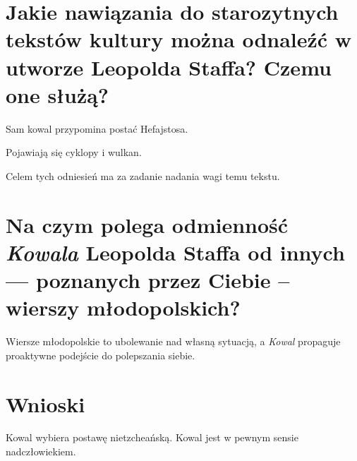 \documentclass[a4paper]{article}
\begin{document}
\section{Jakie nawiązania do starozytnych tekstów kultury można odnaleźć w utworze Leopolda Staffa? Czemu one służą?}
Sam kowal przypomina postać Hefajstosa.

Pojawiają się cyklopy i wulkan.

Celem tych odniesień ma za zadanie nadania wagi temu tekstu.
\section{Na czym polega odmienność \emph{Kowala} Leopolda Staffa od innych --- poznanych przez Ciebie -- wierszy młodopolskich?}
Wiersze młodopolskie to ubolewanie nad własną sytuacją, a \emph{Kowal} propaguje proaktywne podejście do polepszania siebie.
\section{Wnioski}
Kowal wybiera postawę nietzcheańską. Kowal jest w pewnym sensie nadczłowiekiem.
\end{document}
